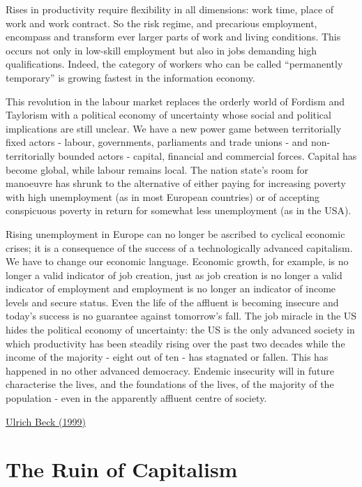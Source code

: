 \documentclass[
]{book}
\begin{document}
Rises in productivity require flexibility in all dimensions: work time, place of work and work contract. So the risk regime, and precarious employment, encompass and transform ever larger parts of work and living conditions. This occurs not only in low-skill employment but also in jobs demanding high qualifications. Indeed, the category of workers who can be called ``permanently temporary'' is growing fastest in the information economy.

This revolution in the labour market replaces the orderly world of Fordism and Taylorism with a political economy of uncertainty whose social and political implications are still unclear. We have a new power game between territorially fixed actors - labour, governments, parliaments and trade unions - and non-territorially bounded actors - capital, financial and commercial forces. Capital has become global, while labour remains local. The nation state's room for manoeuvre has shrunk to the alternative of either paying for increasing poverty with high unemployment (as in most European countries) or of accepting conspicuous poverty in return for somewhat less unemployment (as in the USA).

Rising unemployment in Europe can no longer be ascribed to cyclical economic crises; it is a consequence of the success of a technologically advanced capitalism. We have to change our economic language. Economic growth, for example, is no longer a valid indicator of job creation, just as job creation is no longer a valid indicator of employment and employment is no longer an indicator of income levels and secure status. Even the life of the affluent is becoming insecure and today's success is no guarantee against tomorrow's fall. The job miracle in the US hides the political economy of uncertainty: the US is the only advanced society in which productivity has been steadily rising over the past two decades while the income of the majority - eight out of ten - has stagnated or fallen. This has happened in no other advanced democracy. Endemic insecurity will in future characterise the lives, and the foundations of the lives, of the majority of the population - even in the apparently affluent centre of society.

\href{https://www.newstatesman.com/node/148758}{Ulrich Beck (1999)}

\hypertarget{the-ruin-of-capitalism}{%
\section{The Ruin of Capitalism}\label{the-ruin-of-capitalism}}
\end{document}

